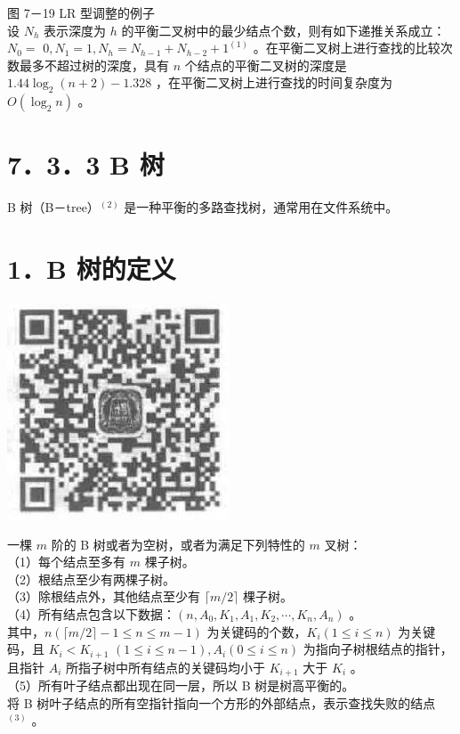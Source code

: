 \documentclass[10pt]{article}
\begin{document}
图 7－19 LR 型调整的例子\\
设 $N_{h}$ 表示深度为 $h$ 的平衡二叉树中的最少结点个数，则有如下递推关系成立：$N_{0}=$ $0, N_{1}=1, N_{h}=N_{h-1}+N_{h-2}+1^{(1)}$ 。在平衡二叉树上进行查找的比较次数最多不超过树的深度，具有 $n$ 个结点的平衡二叉树的深度是 $1.44 \log _{2}(n+2)-1.328$ ，在平衡二叉树上进行查找的时间复杂度为 $O\left(\log _{2} n\right)$ 。

\section*{7．3．3 B 树}
B 树（B－tree）${ }^{(2)}$ 是一种平衡的多路查找树，通常用在文件系统中。

\section*{1．B 树的定义}
\begin{center}
\includegraphics[max width=\textwidth]{2025_06_06_704745ea57b15b2333e5g-248}
\end{center}

一棵 $m$ 阶的 B 树或者为空树，或者为满足下列特性的 $m$ 叉树：\\
（1）每个结点至多有 $m$ 棵子树。\\
（2）根结点至少有两棵子树。\\
（3）除根结点外，其他结点至少有 $\lceil m / 2\rceil$ 棵子树。\\
（4）所有结点包含以下数据：$\left(n, A_{0}, K_{1}, A_{1}, K_{2}, \cdots, K_{n}, A_{n}\right)$ 。\\
其中，$n(\lceil m / 2\rceil-1 \leqslant n \leqslant m-1)$ 为关键码的个数，$K_{i}(1 \leqslant i \leqslant n)$ 为关键码，且 $K_{i}<K_{i+1}$ $(1 \leqslant i \leqslant n-1), A_{i}(0 \leqslant i \leqslant n)$ 为指向子树根结点的指针，且指针 $A_{i}$ 所指子树中所有结点的关键码均小于 $K_{i+1}$ 大于 $K_{i}$ 。\\
（5）所有叶子结点都出现在同一层，所以 B 树是树高平衡的。\\
将 B 树叶子结点的所有空指针指向一个方形的外部结点，表示查找失败的结点 ${ }^{(3)}$ 。
\end{document}
